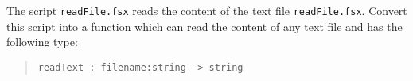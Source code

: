 The script \lstinline[language=console]{readFile.fsx} reads the
content of the text file
\lstinline[language=console]{readFile.fsx}. Convert this script into a
function which can read the content of any text file and has the
following type:
\begin{quote}
  \mbox{\lstinline!readText : filename:string -> string!}
\end{quote}
